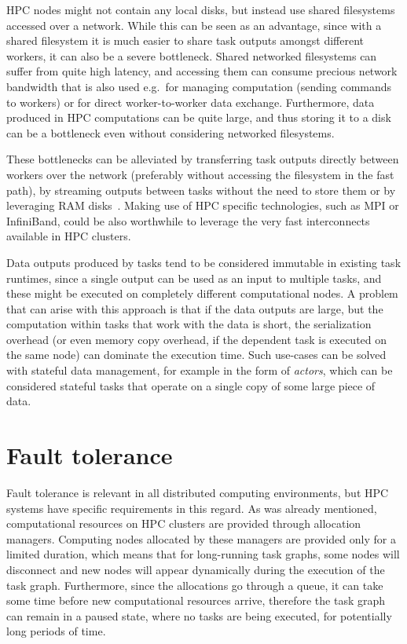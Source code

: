 HPC nodes might not contain any local disks, but instead use shared filesystems accessed over a
network. While this can be seen as an advantage, since with a shared filesystem it is much easier
to share task outputs amongst different workers, it can also be a severe bottleneck. Shared
networked filesystems can suffer from quite high latency, and accessing them can consume precious
network bandwidth that is also used e.g.\ for managing computation (sending commands to workers) or
for direct worker-to-worker data exchange. Furthermore, data produced in HPC computations can be
quite large, and thus storing it to a disk can be a bottleneck even without considering networked
filesystems.

These bottlenecks can be alleviated by transferring task outputs directly between workers over the
network (preferably without accessing the filesystem in the fast path), by streaming outputs
between tasks without the need to store them or by leveraging RAM disks~\cite{hyperloom}.
Making use of HPC specific technologies, such as MPI or InfiniBand, could be also worthwhile to
leverage the very fast interconnects available in HPC clusters.

Data outputs produced by tasks tend to be considered immutable in existing task runtimes, since a
single output can be used as an input to multiple tasks, and these might be executed on completely
different computational nodes. A problem that can arise with this approach is that if the data
outputs are large, but the computation within tasks that work with the data is short, the
serialization overhead (or even memory copy overhead, if the dependent task is executed on the same
node) can dominate the execution time. Such use-cases can be solved with stateful data management,
for example in the form of \emph{actors}, which can be considered stateful tasks that
operate on a single copy of some large piece of data.


\section{Fault tolerance}
Fault tolerance is relevant in all distributed computing environments, but HPC systems have
specific requirements in this regard. As was already mentioned, computational resources on HPC
clusters are provided through allocation managers. Computing nodes allocated by these managers are
provided only for a limited duration, which means that for long-running task graphs, some nodes
will disconnect and new nodes will appear dynamically during the execution of the task graph.
Furthermore, since the allocations go through a queue, it can take some time before new
computational resources arrive, therefore the task graph can remain in a paused state, where no
tasks are being executed, for potentially long periods of time.

